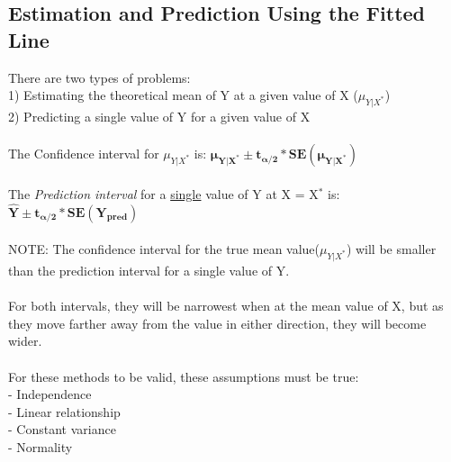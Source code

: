 \documentclass[12pt, a4paper]{article}
\begin{document}
	\subsection{Estimation and Prediction Using the Fitted Line}
	There are two types of problems: \\
	1) Estimating the theoretical mean of Y at a given value of X ($\mu_{Y|X^*}$) \\
	2) Predicting a single value of Y for a given value of X \\~\\
	The Confidence interval for $\mu_{Y|X^*}$ is: $\bm{\mu_{Y|X^*} \pm t_{\alpha/2}*SE(\mu_{Y|X^*})}$ \\~\\
	The \textit{Prediction interval} for a \underline{single} value of Y at X = X$^*$ is: $\bm{\hat{Y} \pm t_{\alpha/2}*SE(Y_{pred})}$ \\~\\
	\noindent NOTE: The confidence interval for the true mean value($\mu_{Y|X^*}$) will be smaller than the prediction interval for a single value of Y. \\~\\
	For both intervals, they will be narrowest when at the mean value of X, but as they move farther away from the value in either direction, they will become wider. \\~\\ 
	For these methods to be valid, these assumptions must be true: \\
	- Independence \\
	- Linear relationship \\
	- Constant variance \\
	- Normality \\~\\
	
\end{document}
